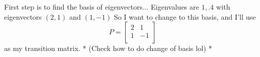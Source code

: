 \documentclass[12pt]{article}
\newenvironment{problem}[2][Problem]{\begin{trivlist}
\item[\hskip \labelsep {\bfseries #1}\hskip \labelsep {\bfseries #2.}]}{\end{trivlist}}
\theoremstyle{definition}
\theoremstyle{definition}
\theoremstyle{definition}
\theoremstyle{definition}
\begin{document}
\begin{problem}{4.13}
First step is to find the basis of eigenvectors... Eigenvalues are $1, .4$ with eigenvectors $(2, 1)$ and $(1, -1)$ So I want to change to this basis, and I'll use 
$$
P = \begin{bmatrix}
2 & 1 \\
1 & -1\\
\end{bmatrix}
$$
as my transition matrix. * (Check how to do change of basis lol) *
\end{problem}

\begin{problem}{4.15}
\end{problem}

\begin{problem}{4.16}
\end{problem}

\begin{problem}{4.18}
\end{problem}

\begin{problem}{4.20}
\end{problem}

\begin{problem}{4.24}
\end{problem}

\begin{problem}{4.25}
\end{problem}

\begin{problem}{4.27}
\end{problem}

\begin{problem}{4.28}
\end{problem}

\begin{problem}{4.31}
\end{problem}

\begin{problem}{4.32}
\end{problem}

\begin{problem}{4.33}
\end{problem}

\begin{problem}{4.36}
\end{problem}

\begin{problem}{4.38}
\end{problem}
\end{document}
